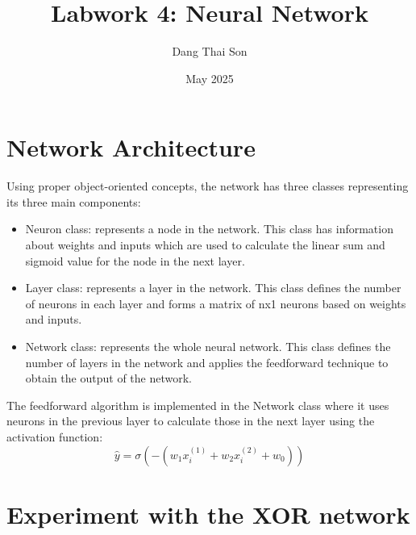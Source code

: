 \documentclass{article}
\title{Labwork 4: Neural Network}
\author{Dang Thai Son}
\date{May 2025}
\begin{document}
\maketitle

\section{Network Architecture}
Using proper object-oriented concepts, the network has three classes representing its three main components: 

\begin{itemize}
    \item Neuron class: represents a node in the network. This class has information about weights and inputs which are used to calculate the linear sum and sigmoid value for the node in the next layer.
    \item Layer class: represents a layer in the network. This class defines the number of neurons in each layer and forms a matrix of nx1 neurons based on weights and inputs.
    \item Network class: represents the whole neural network. This class defines the number of layers in the network and applies the feedforward technique to obtain the output of the network.
\end{itemize}

The feedforward algorithm is implemented in the Network class where it uses neurons in the previous layer to calculate those in the next layer using the activation function:
\[
\hat{y} = \sigma\left(-\left(w_1 x_i^{(1)} + w_2 x_i^{(2)} + w_0\right)\right)
\]

\section{Experiment with the XOR network}
\end{document}
